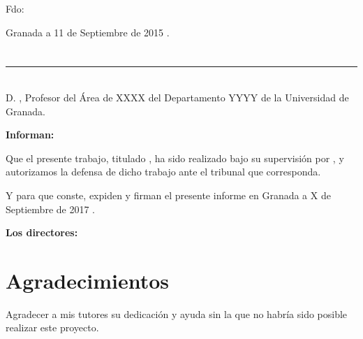 \vspace{6cm}

\noindent Fdo: \myName

\vspace{2cm}

\begin{flushright}
Granada a 11 de Septiembre de 2015 .
\end{flushright}


\chapter*{}
\thispagestyle{empty}

\noindent\rule[-1ex]{\textwidth}{2pt}\\[4.5ex]

D. \textbf{\myProf}, Profesor del Área de XXXX del Departamento YYYY de la Universidad de Granada.

\vspace{0.5cm}

\textbf{Informan:}

\vspace{0.5cm}

Que el presente trabajo, titulado \textit{\textbf{\myTitle}},
ha sido realizado bajo su supervisión por \textbf{\myName}, y autorizamos la defensa de dicho trabajo ante el tribunal
que corresponda.

\vspace{0.5cm}

Y para que conste, expiden y firman el presente informe en Granada a X de Septiembre de 2017 .

\vspace{1cm}

\textbf{Los directores:}

\vspace{5cm}

\noindent \textbf{\myProf}

\chapter*{Agradecimientos}
\thispagestyle{empty}

       \vspace{1cm}


Agradecer a mis tutores su dedicación y ayuda sin la que no habría sido
posible realizar este proyecto.
